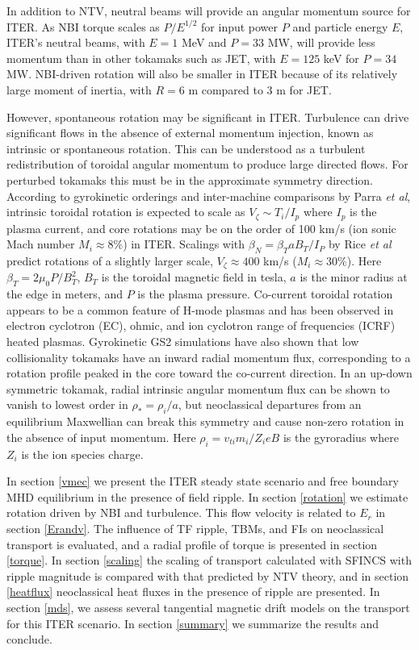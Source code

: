 \documentclass[aip, pop, preprint]{revtex4-1}
\numberwithin{figure}{section}
\numberwithin{equation}{section}
\begin{document}
In addition to NTV, neutral beams will provide an angular momentum source for ITER. As NBI torque scales as $P/E^{1/2}$ for input power $P$ and particle energy $E$, ITER's neutral beams, with $E = 1$ MeV and $P = 33$ MW, will provide less momentum than in other tokamaks such as JET, with $E = 125$ keV for $P = 34$ MW.\cite{Ciric2011} NBI-driven rotation will also be smaller in ITER because of its relatively large moment of inertia, with $R = 6$ m compared to 3 m for JET. 

However, spontaneous rotation may be significant in ITER. Turbulence can drive significant flows in the absence of external momentum injection, known as intrinsic or spontaneous rotation. This can be understood as a turbulent redistribution of toroidal angular momentum to produce large directed flows. For perturbed tokamaks this must be in the approximate symmetry direction. According to gyrokinetic orderings and inter-machine comparisons by Parra \textit{et al},\cite{Parra2012} intrinsic toroidal rotation is expected to scale as $V_{\zeta} \sim  T_i/I_p$ where $I_p$ is the plasma current, and core rotations may be on the order of 100 km/s (ion sonic Mach number $M_i \approx 8\%$) in ITER. Scalings with $\beta_N = \beta_T a B_T/I_P$ by Rice \textit{et al}\cite{Rice2007} predict rotations of a slightly larger scale, $V_{\zeta} \approx 400$ km/s ($M_i \approx 30\%$). Here $\beta_T =  2\mu_0 P/B_T^2$, $B_T$ is the toroidal magnetic field in tesla, $a$ is the minor radius at the edge in meters, and $P$ is the plasma pressure. Co-current toroidal rotation appears to be a common feature of H-mode plasmas and has been observed in electron cyclotron (EC),\cite{DeGrassie2007} ohmic,\cite{DeGrassie2007} and ion cyclotron range of frequencies (ICRF) \cite{Noterdaeme2003} heated plasmas. Gyrokinetic GS2 simulations have also shown that low collisionality tokamaks have an inward radial momentum flux, corresponding to a rotation profile peaked in the core toward the co-current direction.\cite{Barnes2013} In an up-down symmetric tokamak, radial intrinsic angular momentum flux can be shown to vanish to lowest order in $\rho_* = \rho_i/a$, but neoclassical departures from an equilibrium Maxwellian can break this symmetry and cause non-zero rotation in the absence of input momentum.\cite{Barnes2013} Here $\rho_i = v_{ti}m_i /{Z_ieB}$ is the gyroradius where $Z_i$ is the ion species charge.

In section \ref{vmec} we present the ITER steady state scenario and free boundary MHD equilibrium in the presence of field ripple. In section \ref{rotation} we estimate rotation driven by NBI and turbulence. This flow velocity is related to $E_r$ in section \ref{Erandv}. The influence of TF ripple, TBMs, and FIs on neoclassical transport is evaluated, and a radial profile of torque is presented in section \ref{torque}. In section \ref{scaling} the scaling of transport calculated with SFINCS with ripple magnitude is compared with that predicted by NTV theory, and in section \ref{heatflux} neoclassical heat fluxes in the presence of ripple are presented. In section \ref{mds}, we assess several tangential magnetic drift models on the transport for this ITER scenario. In section \ref{summary} we summarize the results and conclude.
\end{document}
